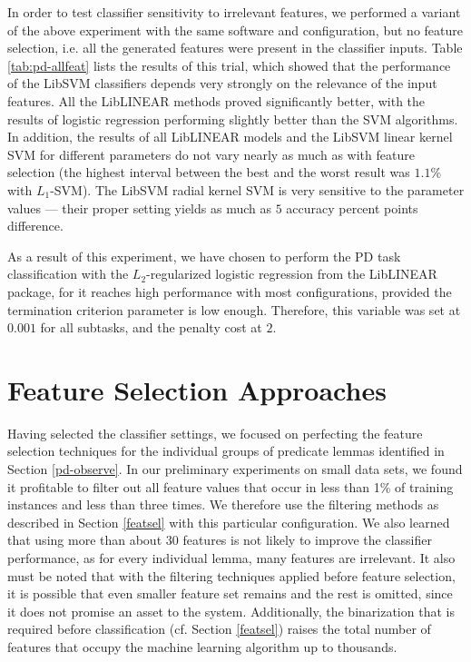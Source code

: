 \documentclass[12pt,notitlepage]{report}
\begin{document}
In order to test classifier sensitivity to irrelevant features, we performed a variant of the above experiment with the same software and configuration, but no feature selection, i.e. all the generated features were present in the classifier inputs. Table \ref{tab:pd-allfeat} lists the results of this trial, which showed that the performance of the LibSVM classifiers depends very strongly on the relevance of the input features. All the LibLINEAR methods proved significantly better, with the results of logistic regression performing slightly better than the SVM algorithms. In addition, the results of all LibLINEAR models and the LibSVM linear kernel SVM for different parameters do not vary nearly as much as with feature selection (the highest interval between the best and the worst result was $1.1\%$ with $L_1$-SVM). The LibSVM radial kernel SVM is very sensitive to the parameter values --- their proper setting yields as much as $5$ accuracy percent points difference. 

As a result of this experiment, we have chosen to perform the PD task classification with the $L_2$-regularized logistic regression from the LibLINEAR package, for it reaches high performance with most configurations, provided the termination criterion parameter is low enough. Therefore, this variable was set at $0.001$ for all subtasks, and the penalty cost at $2$.

\section{Feature Selection Approaches}\label{pd-training}

Having selected the classifier settings, we focused on perfecting the feature selection techniques for the individual groups of predicate lemmas identified in Section \ref{pd-observe}. In our preliminary experiments on small data sets, we found it profitable to filter out all feature values that occur in less than 1\% of training instances and less than three times. We therefore use the filtering methods as described in Section \ref{featsel} with this particular configuration. We also learned that using more than about 30 features is not likely to improve the classifier performance, as for every individual lemma, many features are irrelevant. It also must be noted that with the filtering techniques applied before feature selection, it is possible that even smaller feature set remains and the rest is omitted, since it does not promise an asset to the system. Additionally, the binarization that is required before classification (cf. Section \ref{featsel}) raises the total number of features that occupy the machine learning algorithm up to thousands.
\end{document}
